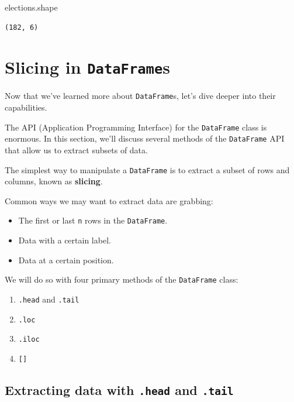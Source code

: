 \documentclass[
  letterpaper,
  DIV=11,
  numbers=noendperiod]{scrreprt}
\newenvironment{Shaded}{\begin{snugshade}}{\end{snugshade}}
\newcommand{\NormalTok}[1]{\textcolor[rgb]{0.00,0.23,0.31}{#1}}
\providecommand{\tightlist}{%
  \setlength{\itemsep}{0pt}\setlength{\parskip}{0pt}}\usepackage{longtable,booktabs,array}
\begin{document}
\begin{Shaded}
\begin{Highlighting}[]
\NormalTok{elections.shape}
\end{Highlighting}
\end{Shaded}

\begin{verbatim}
(182, 6)
\end{verbatim}

\section{\texorpdfstring{Slicing in
\texttt{DataFrame}s}{Slicing in DataFrames}}\label{slicing-in-dataframes}

Now that we've learned more about \texttt{DataFrame}s, let's dive deeper
into their capabilities.

The API (Application Programming Interface) for the \texttt{DataFrame}
class is enormous. In this section, we'll discuss several methods of the
\texttt{DataFrame} API that allow us to extract subsets of data.

The simplest way to manipulate a \texttt{DataFrame} is to extract a
subset of rows and columns, known as \textbf{slicing}.

Common ways we may want to extract data are grabbing:

\begin{itemize}
\tightlist
\item
  The first or last \texttt{n} rows in the \texttt{DataFrame}.
\item
  Data with a certain label.
\item
  Data at a certain position.
\end{itemize}

We will do so with four primary methods of the \texttt{DataFrame} class:

\begin{enumerate}
\def\labelenumi{\arabic{enumi}.}
\tightlist
\item
  \texttt{.head} and \texttt{.tail}
\item
  \texttt{.loc}
\item
  \texttt{.iloc}
\item
  \texttt{{[}{]}}
\end{enumerate}

\subsection{\texorpdfstring{Extracting data with \texttt{.head} and
\texttt{.tail}}{Extracting data with .head and .tail}}\label{extracting-data-with-.head-and-.tail}
\end{document}
